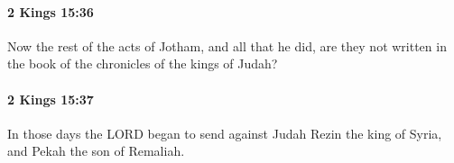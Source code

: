 		\paragraph{2 Kings 15:36} %
			\label{2KINGS-15-36}

			Now the rest of the acts of Jotham, and all that he did, are they not written in the book of the chronicles of the kings of Judah?


		\paragraph{2 Kings 15:37} %
			\label{2KINGS-15-37}

			In those days the LORD began to send against Judah Rezin the king of Syria, and Pekah the son of Remaliah.


